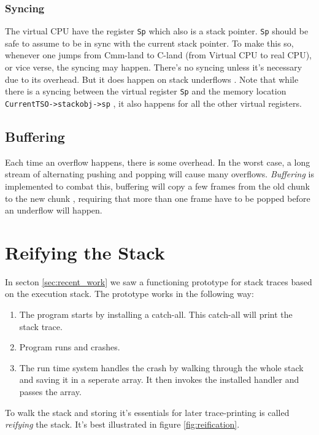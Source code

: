 \subsubsection{Syncing}

The virtual CPU have the register \texttt{Sp} which also is a stack
pointer. \texttt{Sp} should be safe to assume to be in sync with
the current stack pointer. To make this so, whenever one jumps
from Cmm-land to C-land (from Virtual CPU to real CPU), or vice
verse, the syncing may happen. There's no syncing unless it's
necessary due to its overhead. But it does happen on stack underflows
\cite{github_underflow_frame}. Note that while there is a syncing
between the virtual register \texttt{Sp} and the memory location
\texttt{CurrentTSO->stackobj->sp} \cite{github_sync_sp}, it also happens
for all the other virtual registers.

\subsection{Buffering}

Each time an overflow happens, there is some overhead. In the worst
case, a long stream of alternating pushing and popping will cause
many overflows. \emph{Buffering} is implemented to combat this,
buffering will copy a few frames from the old chunk to the new chunk
\cite{github_stack_buffering}, requiring that more than one frame have
to be popped before an underflow will happen.

\section{Reifying the Stack}

In secton \ref{sec:recent_work} we saw a functioning prototype for
stack traces based on the execution stack. The prototype works in the
following way:

\begin{enumerate}
  \item
    The program starts by installing a catch-all. This catch-all will
    print the stack trace.
  \item
    Program runs and crashes.
  \item
    The run time system handles the crash by walking through the whole
    stack and saving it in a seperate array. It then invokes the
    installed handler and passes the array.
\end{enumerate}

To walk the stack and storing it's essentials for later trace-printing is
called \emph{reifying} the stack. It's best illustrated in figure \ref{fig:reification}.

